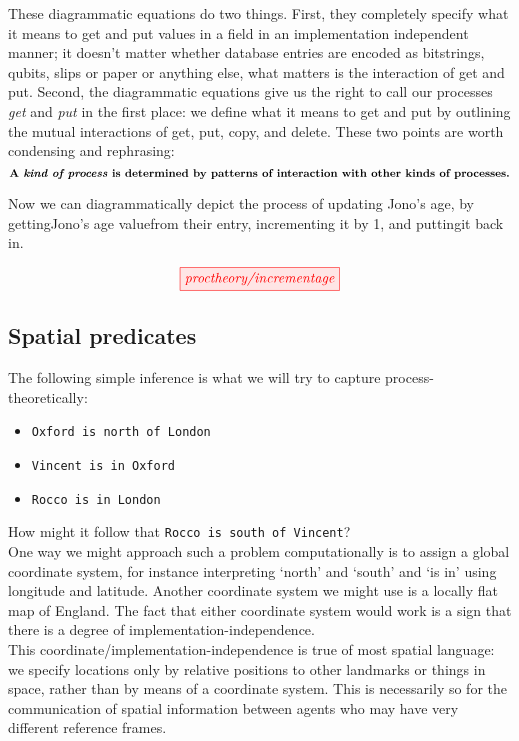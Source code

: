 These diagrammatic equations do two things. First, they completely specify what it means to get and put values in a field in an implementation independent manner; it doesn't matter whether database entries are encoded as bitstrings, qubits, slips or paper or anything else, what matters is the interaction of get and put. Second, the diagrammatic equations give us the right to call our processes \emph{get} and \emph{put} in the first place: we define what it means to get and put by outlining the mutual interactions of get, put, copy, and delete. These two points are worth condensing and rephrasing:
\[
\textbf{A \emph{kind of process} is determined by patterns of interaction with other kinds of processes.}
\]

Now we can diagrammatically depict the process of updating Jono's age, by \bB getting\e Jono's \bO age value\e from their \bM entry\e, incrementing it by 1, and \bB putting\e it back in.

\[\tikzfig{proctheory/incrementage}\]

\subsection{Spatial predicates}

The following simple inference is what we will try to capture process-theoretically:

\begin{itemize}
\item \texttt{Oxford is north of London}
\item \texttt{Vincent is in Oxford}
\item \texttt{Rocco is in London}
\end{itemize}

How might it follow that \texttt{Rocco is south of Vincent}?\\

One way we might approach such a problem computationally is to assign a global coordinate system, for instance interpreting `north' and `south' and `is in' using longitude and latitude. Another coordinate system we might use is a locally flat map of England. The fact that either coordinate system would work is a sign that there is a degree of implementation-independence.\\

This coordinate/implementation-independence is true of most spatial language: we specify locations only by relative positions to other landmarks or things in space, rather than by means of a coordinate system. This is necessarily so for the communication of spatial information between agents who may have very different reference frames.\\

